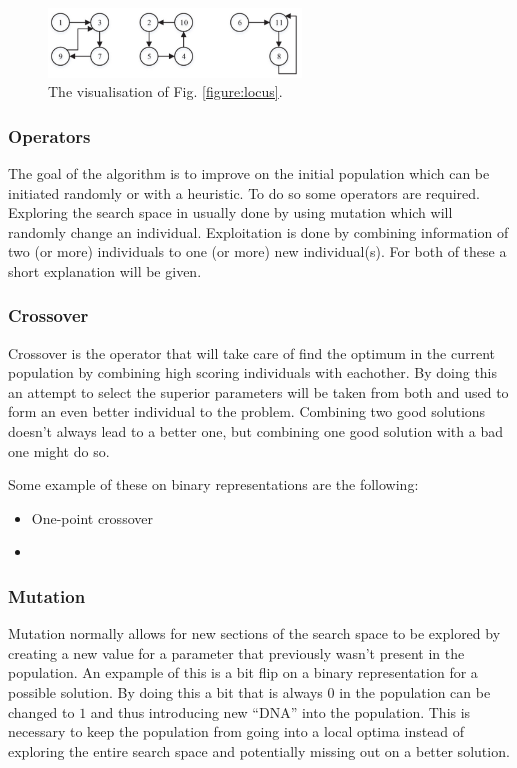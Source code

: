 \begin{figure}
\begin{center}
\includegraphics[width=0.6\textwidth]{encode.png}
\caption{The visualisation of Fig. \ref{figure:locus}.}\label{figure:encode}
\end{center}
\end{figure}

\subsubsection{Operators}
The goal of the algorithm is to improve on the initial population which can be initiated randomly or with a heuristic.
To do so some operators are required.
Exploring the search space in usually done by using mutation which will randomly change an individual.
Exploitation is done by combining information of two (or more) individuals to one (or more) new individual(s).
For both of these a short explanation will be given.

\subsubsection*{Crossover}
Crossover is the operator that will take care of find the optimum in the current population by combining high scoring individuals with eachother.
By doing this an attempt to select the superior parameters will be taken from both and used to form an even better individual to the problem.
Combining two good solutions doesn't always lead to a better one, but combining one good solution with a bad one might do so.

Some example of these on binary representations are the following:
\begin{itemize}
\item One-point crossover
\item
\end{itemize}

\subsubsection*{Mutation}
Mutation normally allows for new sections of the search space to be explored by creating a new value for a parameter that previously wasn't present in the population.
An expample of this is a bit flip on a binary representation for a possible solution.
By doing this a bit that is always $0$ in the population can be changed to $1$ and thus introducing new ``DNA'' into the population.
This is necessary to keep the population from going into a local optima instead of exploring the entire search space and potentially missing out on a better solution.